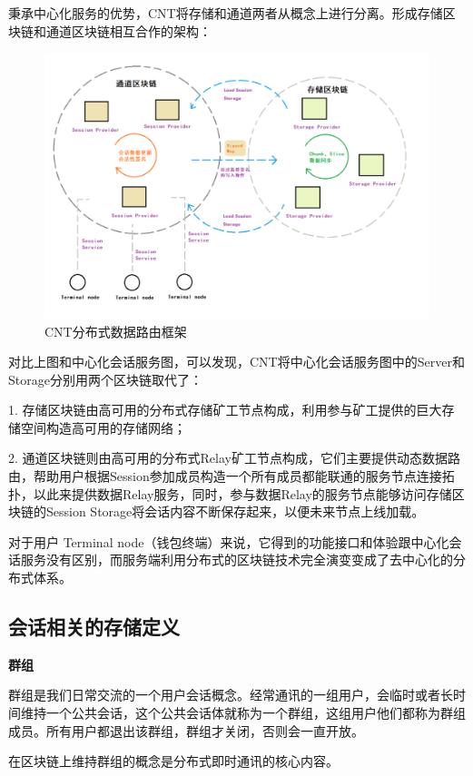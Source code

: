\documentclass[a4paper,12pt]{article}
\begin{document}
秉承中心化服务的优势，CNT将存储和通道两者从概念上进行分离。形成存储区块链和通道区块链相互合作的架构：


\begin {figure} [htbp]
\centering \includegraphics [width = 5in] {pic_cn/c3.png}
\caption {CNT分布式数据路由框架} \label {fig: c3}
\end {figure}

对比上图和中心化会话服务图，可以发现，CNT将中心化会话服务图中的Server和Storage分别用两个区块链取代了：
 
1.	存储区块链由高可用的分布式存储矿工节点构成，利用参与矿工提供的巨大存储空间构造高可用的存储网络；

2.	通道区块链则由高可用的分布式Relay矿工节点构成，它们主要提供动态数据路由，帮助用户根据Session参加成员构造一个所有成员都能联通的服务节点连接拓扑，以此来提供数据Relay服务，同时，参与数据Relay的服务节点能够访问存储区块链的Session Storage将会话内容不断保存起来，以便未来节点上线加载。

对于用户 Terminal node（钱包终端）来说，它得到的功能接口和体验跟中心化会话服务没有区别，而服务端利用分布式的区块链技术完全演变变成了去中心化的分布式体系。

\subsection{会话相关的存储定义}


\textbf{群组}

群组是我们日常交流的一个用户会话概念。经常通讯的一组用户，会临时或者长时间维持一个公共会话，这个公共会话体就称为一个群组，这组用户他们都称为群组成员。所有用户都退出该群组，群组才关闭，否则会一直开放。

        在区块链上维持群组的概念是分布式即时通讯的核心内容。
\end{document}
